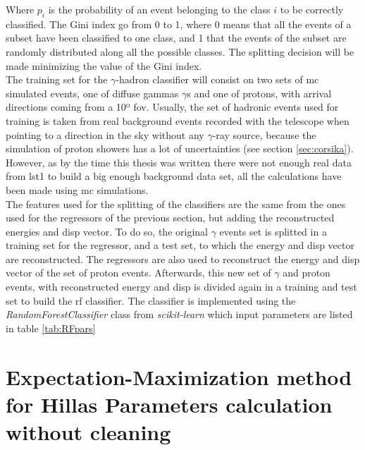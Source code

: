 \documentclass[main.tex]{subfiles}
\begin{document}
Where $p_i$ is the probability of an event belonging to the class $i$ to be correctly classified.  The Gini index go from 0 to 1, where 0 means that all the events of a subset have been classified to one class, and 1 that the events of the subset are randomly distributed along all the possible classes. The splitting decision will be made minimizing the value of the Gini index.\\
The training set for the $\gamma$-hadron classifier will consist on two sets of \gls{mc} simulated events, one of diffuse gammas $\gamma$s and one of protons, with arrival directions coming from a 10º \gls{fov}. Usually, the set of hadronic events used for training is taken from real background events recorded with the telescope when pointing to a direction in the sky without any $\gamma$-ray source, because the simulation of proton showers has a lot of uncertainties (see section \ref{sec:corsika}). However, as by the time this thesis was written there were not enough real data from \gls{lst}1 to build a big enough background data set, all the calculations have been made using \gls{mc} simulations.\\
The features used for the splitting of the classifiers are the same from the ones used for the regressors of the previous section, but adding the reconstructed energies and disp vector. To do so, the original $\gamma$ events set is splitted in a training set for the regressor, and a test set, to which the energy and disp vector are reconstructed. The regressors are also used to reconstruct the energy and disp vector of the set of proton events. Afterwards, this new set of $\gamma$ and proton events, with reconstructed energy and disp is divided again in a training and test set to build the \gls{rf} classifier.
The classifier is implemented using the \textit{RandomForestClassifier} class from \textit{scikit-learn} which input parameters are listed in table \ref{tab:RFpars}

\section[Expectation-Maximization method for Hillas Parameters...]{Expectation-Maximization method for Hillas Parameters calculation without cleaning} \label{sec:EM}
\end{document}
